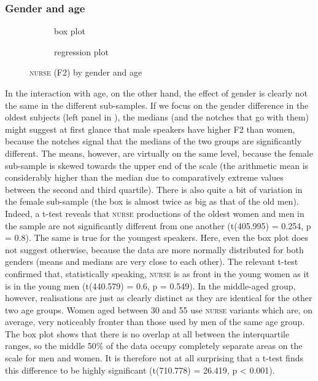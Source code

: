 \subsubsection{Gender and age}
\label{sec.prod.res.vow.nurse.f2.genderage}

\begin{figure}
	
	\begin{subfigure}{.49\textwidth}
		
			\resizebox{\linewidth}{!}{} 
		\caption{box plot}
		\label{fig.box.f2w.nurse.genderage}
	\end{subfigure}
	\begin{subfigure}{.49\textwidth}
		
			\resizebox{\linewidth}{!}{} 
		\caption{regression plot}
		\label{fig.scatter.f2w.nurse.genderage}
	\end{subfigure}
	\caption{\textsc{nurse} (F2) by gender and age}
\end{figure}

In the interaction with age, on the other hand, the effect of gender is clearly not the same in the different sub-samples.
If we focus on the gender difference in the oldest subjects (left panel in ), the medians (and the notches that go with them) might suggest at first glance that male speakers have higher F2 than women, because the notches signal that the medians of the two groups are significantly different.
The means, however, are virtually on the same level, because the female sub-sample is skewed towards the upper end of the scale (the arithmetic mean is considerably higher than the median due to comparatively extreme values between the second and third quartile).
There is also quite a bit of variation in the female sub-sample (the box is almost twice as big as that of the old men).
Indeed, a t-test reveals that \textsc{nurse} productions of the oldest women and men in the sample are not significantly different from one another (t(405.995) = 0.254, p = 0.8).
The same is true for the youngest speakers.
Here, even the box plot does not suggest otherwise, because the data are more normally distributed for both genders (means and medians are very close to each other).
The relevant t-test confirmed that, statistically speaking, \textsc{nurse} is as front in the young women as it is in the young men (t(440.579) = 0.6, p = 0.549).
In the middle-aged group, however, realisations are just as clearly distinct as they are identical for the other two age groups.
Women aged between 30 and 55 use \textsc{nurse} variants which are, on average, very noticeably fronter than those used by men of the same age group.
The box plot shows that there is no overlap at all between the interquartile ranges, so the middle 50\% of the data occupy completely separate areas on the scale for men and women.
It is therefore not at all surprising that a t-test finds this difference to be highly significant (t(710.778) = 26.419, p < 0.001).

